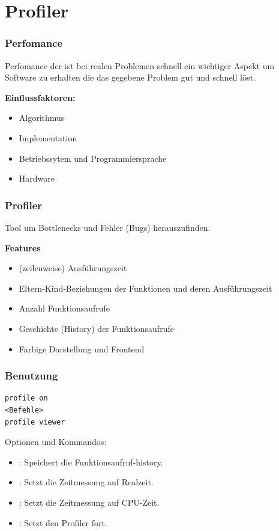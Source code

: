 \documentclass[hyperref={xetex}]{beamer}
\begin{document}
\section{Profiler}

\begin{frame}[fragile]\frametitle{Perfomance}

Perfomance der ist bei realen Problemen schnell ein wichtiger Aspekt um Software zu erhalten die das gegebene Problem gut und schnell löst.

\textbf{Einflussfaktoren:}
\begin{itemize}
 \item Algorithmus
 \item \alert{Implementation}
 \item Betriebssytem und Programmiersprache
 \item Hardware
\end{itemize}

\end{frame}

\begin{frame}[fragile]\frametitle{Profiler}
Tool um Bottlenecks und Fehler (Bugs) herauszufinden.

\textbf{Features}
\begin{itemize}
 \item (zeilenweise) Ausführungszeit
\item Eltern-Kind-Beziehungen der Funktionen und deren Ausführungszeit
 \item Anzahl Funktionsaufrufe
\item Geschichte (History) der Funktionsaufrufe
\item Farbige Darstellung und Frontend
\end{itemize}

\end{frame}

\begin{frame}[fragile]\frametitle{Benutzung}
\begin{lstlisting}
profile on 
<Befehle>
profile viewer
\end{lstlisting}
Optionen und Kommandos:
\begin{itemize}
 \item {}: Speichert die Funktionsaufruf-history.
 \item {}: Setzt die Zeitmessung auf Realzeit.
\item {}: Setzt die Zeitmessung auf CPU-Zeit.
 \item {}: Setzt den Profiler fort.
\end{itemize}

\end{frame}
\end{document}
